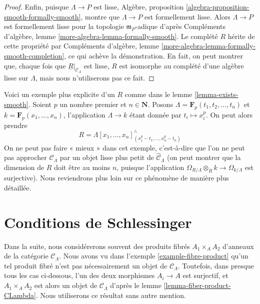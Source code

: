 \begin{proof}
\medskip\noindent
Enfin, puisque $\Lambda \to P$ est lisse, Algèbre, proposition
\ref{algebra-proposition-smooth-formally-smooth}, montre que
$\Lambda \to P$ est formellement lisse. Alors $\Lambda \to P$ est
formellement lisse pour
la topologie $\mathfrak m_P$-adique d'après Compléments d'algèbre, lemme
\ref{more-algebra-lemma-formally-smooth}. Le complété $R$ hérite de cette
propriété par Compléments d'algèbre, lemme
\ref{more-algebra-lemma-formally-smooth-completion}, ce qui achève la
démonstration. En fait, on peut montrer que, chaque fois que
$\underline{R}|_{\mathcal{C}_\Lambda}$ est lisse, $R$ est isomorphe au
complété d'une algèbre lisse sur $\Lambda$, mais nous n'utiliserons pas ce
fait.
\end{proof}

\begin{example}
\label{example-smooth-explicit}
Voici un exemple plus explicite d'un $R$ comme dans le lemme
\ref{lemma-exists-smooth}. Soient $p$ un nombre premier et
$n \in \mathbf{N}$. Posons
$\Lambda = \mathbf{F}_p(t_1, t_2, \ldots, t_n)$ et
$k = \mathbf{F}_p(x_1, \ldots, x_n)$, l'application $\Lambda \to k$ étant
donnée par $t_i \mapsto x_i^p$. On peut alors prendre
$$
R = \Lambda[x_1, \ldots, x_n]^\wedge_{(x_1^p - t_1, \ldots, x_n^p - t_n)}
$$
On ne peut pas faire « mieux » dans cet exemple, c'est-à-dire que l'on ne
peut pas approcher $\mathcal{C}_\Lambda$ par un objet lisse plus petit de
$\widehat{\mathcal{C}}_\Lambda$ (on peut montrer que la dimension de $R$ doit
être au moins $n$, puisque l'application
$\Omega_{R/\Lambda} \otimes_R k \to \Omega_{k/\Lambda}$ est surjective). Nous
reviendrons plus loin sur ce phénomène de manière plus détaillée.
\end{example}







\section{Conditions de Schlessinger}
\label{section-schlessinger-conditions}

\noindent
Dans la suite, nous considérerons souvent des produits fibrés
$A_1 \times_A A_2$ d'anneaux de la catégorie $\mathcal{C}_\Lambda$. Nous
avons vu dans l'exemple \ref{example-fibre-product} qu'un tel produit fibré
n'est pas nécessairement un objet de $\mathcal{C}_\Lambda$. Toutefois, dans
presque tous les cas ci-dessous, l'un des deux morphismes $A_i \to A$ est
surjectif, et $A_1 \times_A A_2$ est alors un objet de
$\mathcal{C}_\Lambda$ d'après le lemme \ref{lemma-fiber-product-CLambda}.
Nous utiliserons ce résultat sans autre mention.

